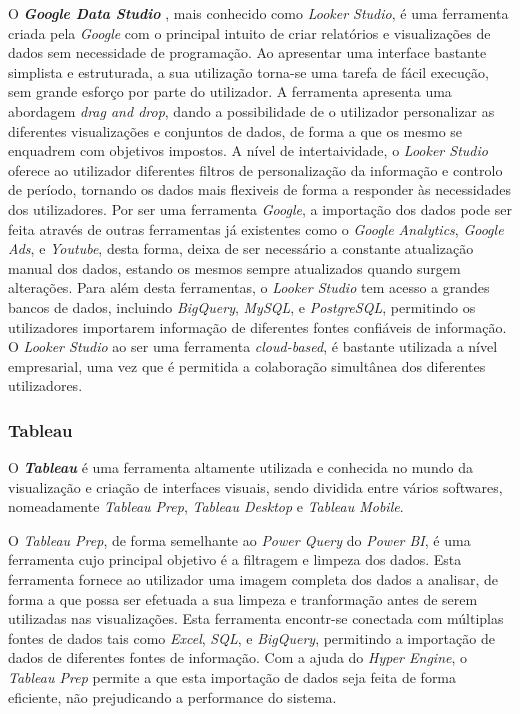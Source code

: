 O \textbf{\textit{Google Data Studio}} \cite{googleStudio}, mais conhecido como \textit{Looker Studio}, é uma ferramenta criada pela \textit{Google} com o principal intuito de criar relatórios e visualizações de dados sem necessidade de programação. Ao apresentar uma interface bastante simplista e estruturada, a sua utilização torna-se uma tarefa de fácil execução, sem grande esforço por parte do utilizador. A ferramenta apresenta uma abordagem \textit{drag and drop}, dando a possibilidade de o utilizador personalizar as diferentes visualizações e conjuntos de dados, de forma a que os mesmo se enquadrem com objetivos impostos. A nível de intertaividade, o \textit{Looker Studio} oferece ao utilizador diferentes filtros de personalização da informação e controlo de período, tornando os dados mais flexiveis de forma a responder às necessidades dos utilizadores. Por ser uma ferramenta \textit{Google}, a importação dos dados pode ser feita através de outras ferramentas já existentes como o \textit{Google Analytics}, \textit{Google Ads}, e \textit{Youtube}, desta forma, deixa de ser necessário a constante atualização manual dos dados, estando os mesmos sempre atualizados quando surgem alterações. Para além desta ferramentas, o \textit{Looker Studio} tem acesso a grandes bancos de dados, incluindo \textit{BigQuery}, \textit{MySQL}, e \textit{PostgreSQL}, permitindo os utilizadores importarem informação de diferentes fontes confiáveis de informação. O \textit{Looker Studio} ao ser uma ferramenta \textit{cloud-based}, é bastante utilizada a nível empresarial, uma vez que é permitida a colaboração simultânea dos diferentes utilizadores.

\subsubsection{Tableau} %
\label{ssub:tableau}

O \textbf{\textit{Tableau}} \cite{tableau} é uma ferramenta altamente utilizada e conhecida no mundo da visualização e criação de interfaces visuais, sendo dividida entre vários softwares, nomeadamente \textit{Tableau Prep}, \textit{Tableau Desktop} e \textit{Tableau Mobile}.

O \textit{Tableau Prep}, de forma semelhante ao \textit{Power Query} do \textit{Power BI}, é uma ferramenta cujo principal objetivo é a filtragem e limpeza dos dados. Esta ferramenta fornece ao utilizador uma imagem completa dos dados a analisar, de forma a que possa ser efetuada a sua limpeza e tranformação antes de serem utilizadas nas visualizações. Esta ferramenta encontr-se conectada com múltiplas fontes de dados tais como \textit{Excel}, \textit{SQL}, e \textit{BigQuery}, permitindo a importação de dados de diferentes fontes de informação. Com a ajuda do \textit{Hyper Engine}, o \textit{Tableau Prep} permite a que esta importação de dados seja feita de forma eficiente, não prejudicando a performance do sistema.

